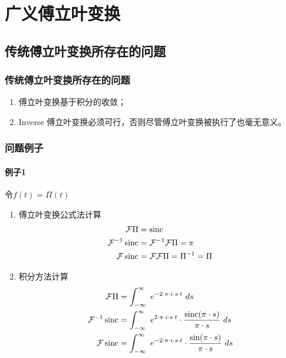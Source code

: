 \chapter{广义傅立叶变换}
\section{传统傅立叶变换所存在的问题}
\subsection{传统傅立叶变换所存在的问题}
\begin{enumerate}
	\item 傅立叶变换基于积分的收敛；
	\item Inverse 傅立叶变换必须可行，否则尽管傅立叶变换被执行了也毫无意义。
\end{enumerate}
\subsection{问题例子}
\subsubsection{例子1}
令$f(t)=\Pi(t)$
\begin{enumerate}
	\item 傅立叶变换公式法计算
	      \begin{align*}
		      \mathcal{F}\Pi        & =\operatorname{sinc}                                  \\
		      \mathcal{F}^{-1}\operatorname{sinc} & =\mathcal{F}^{-1}\mathcal{F}\Pi=\pi     \\
		      \mathcal{F}\operatorname{sinc}      & =\mathcal{F}\mathcal{F}\Pi=\Pi^{-1}=\Pi
	      \end{align*}
	\item 积分方法计算
	      \begin{align*}
		      \mathcal{F}\Pi        & =\int_{-\infty}^{\infty}\ e^{-2\cdot \pi\cdot i\cdot s\cdot t}\ ds                                           \\
		      \mathcal{F}^{-1}\sinc & =\int_{-\infty}^{\infty}\ e^{2\cdot \pi\cdot i\cdot s\cdot t}\cdot \frac{\sinc (\pi\cdot s)}{\pi\cdot s}\ ds \\
		      \mathcal{F}\sinc      & =\int_{-\infty}^{\infty}\ e^{-2\cdot \pi\cdot i\cdot s\cdot t}\cdot \frac{\sin (\pi\cdot s)}{\pi\cdot s}\ ds
	      \end{align*}
\end{enumerate}


